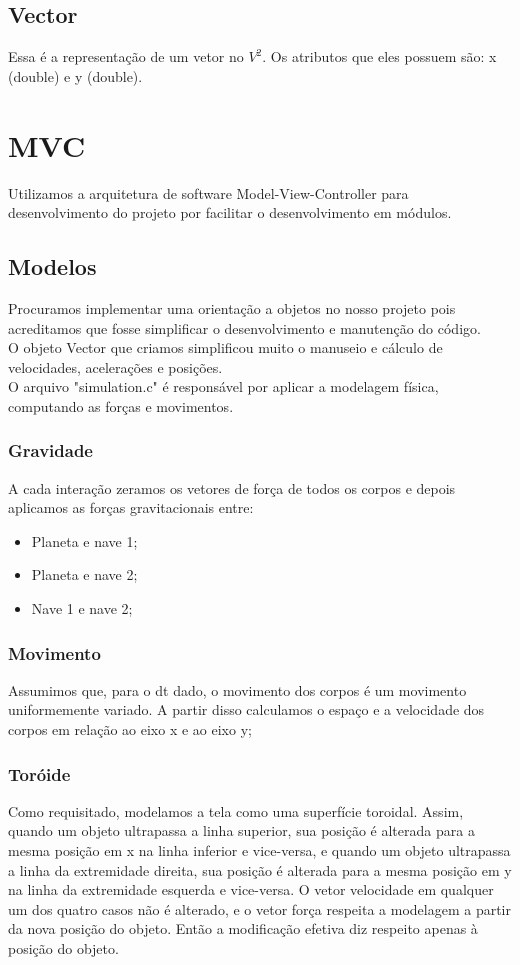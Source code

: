 \documentclass{article}
\begin{document}
\subsection{Vector}
Essa é a representação de um vetor no $V^2$. Os atributos que eles possuem são: x (double) e y (double).

\section{MVC}
Utilizamos a arquitetura de software Model-View-Controller para desenvolvimento do projeto por facilitar o desenvolvimento em módulos.

\subsection{Modelos}
Procuramos implementar uma orientação a objetos no nosso projeto pois acreditamos que fosse simplificar o desenvolvimento e manutenção do
código. \\
O objeto Vector que criamos simplificou muito o manuseio e cálculo de velocidades, acelerações e posições. \\
O arquivo "simulation.c" é responsável por aplicar a modelagem física, computando as forças e movimentos.

\subsubsection{Gravidade}
A cada interação zeramos os vetores de força de todos os corpos e depois aplicamos as forças gravitacionais entre:
\begin{itemize}
\item Planeta e nave 1;
\item Planeta e nave 2;
\item Nave 1 e nave 2;
\end{itemize}

\subsubsection{Movimento}
Assumimos que, para o dt dado, o movimento dos corpos é um movimento uniformemente variado. A partir disso calculamos o espaço e a velocidade dos corpos em relação ao eixo x e ao eixo y;

\subsubsection{Toróide}
Como requisitado, modelamos a tela como uma superfície toroidal. Assim, quando um objeto ultrapassa a linha superior, sua posição é alterada para a mesma posição em x
na linha inferior e vice-versa, e quando um objeto ultrapassa a linha da extremidade direita, sua posição é alterada para a mesma posição em y na linha da extremidade
esquerda e vice-versa. O vetor velocidade em qualquer um dos quatro casos não é alterado, e o vetor força respeita a modelagem a partir da nova posição do objeto.
Então a modificação efetiva diz respeito apenas à posição do objeto.
\end{document}
